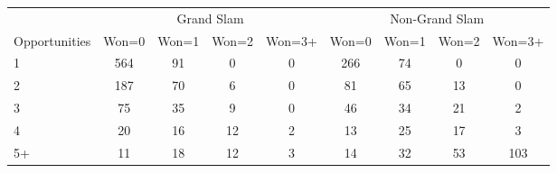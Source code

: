 \begin{tabular}{l cccc cccc}
\toprule
 & \multicolumn{4}{c}{Grand Slam} & \multicolumn{4}{c}{Non-Grand Slam} \\
\cmidrule(lr){2-5} \cmidrule(lr){6-9}
Opportunities & Won=0 & Won=1 & Won=2 & Won=3+ & Won=0 & Won=1 & Won=2 & Won=3+ \\
\midrule
1 & 564 & 91 & 0 & 0 & 266 & 74 & 0 & 0 \\
2 & 187 & 70 & 6 & 0 & 81 & 65 & 13 & 0 \\
3 & 75 & 35 & 9 & 0 & 46 & 34 & 21 & 2 \\
4 & 20 & 16 & 12 & 2 & 13 & 25 & 17 & 3 \\
5+ & 11 & 18 & 12 & 3 & 14 & 32 & 53 & 103 \\
\bottomrule
\end{tabular}
